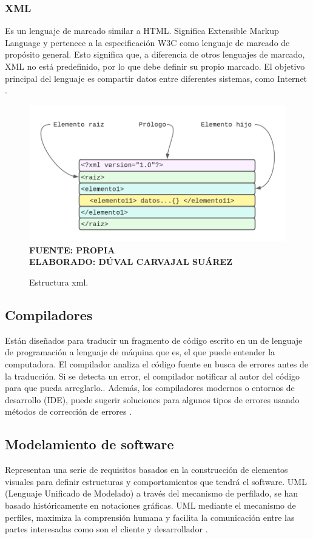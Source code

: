 \subsubsection{XML}

Es un lenguaje de marcado similar a HTML. Significa Extensible Markup Language y pertenece a la especificación W3C como lenguaje de marcado de propósito general. Esto significa que, a diferencia de otros lenguajes de marcado, XML no está predefinido, por lo que debe definir su propio marcado. El objetivo principal del lenguaje es compartir datos entre diferentes sistemas, como Internet \cite{XML-based}.

\begin{figure}[h!]
	\caption{Estructura xml.}
	\includegraphics[width=12cm]{img/xml.png}
	\label{fig:xml}
	\textbf{\\ FUENTE: PROPIA \\ ELABORADO: DÚVAL CARVAJAL SUÁREZ}
\end{figure}

\subsection{Compiladores}
Están diseñados para traducir un fragmento de código escrito en un de lenguaje de programación a lenguaje de máquina que es, el que puede entender la computadora. El compilador analiza el código fuente en busca de errores antes de la traducción. Si se detecta un error, el compilador
notificar al autor del código para que pueda arreglarlo.. Además, los compiladores modernos o entornos de desarrollo (IDE), puede sugerir soluciones para algunos tipos de errores usando métodos de corrección de errores \cite{CoEdit}.

\subsection{Modelamiento de software}
Representan una serie de requisitos basados en la construcción de elementos visuales para definir estructuras y comportamientos que tendrá el software. UML (Lenguaje Unificado de Modelado) a través del mecanismo de perfilado, se han basado históricamente en notaciones gráficas. UML mediante el mecanismo de perfiles, maximiza la comprensión humana y facilita la comunicación entre las partes interesadas como son el cliente y desarrollador \cite{Blended}. 

